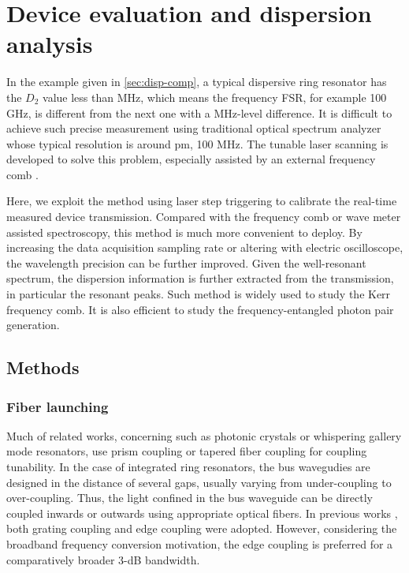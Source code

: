 
\chapter{Device evaluation and dispersion analysis}%


In the example given in \autoref{sec:disp-comp},  a typical dispersive ring resonator has the $ D_2 $ value less than MHz, which means the frequency FSR, for example 100 GHz, is different from the next one with a MHz-level difference. It is difficult to achieve such precise measurement using traditional optical spectrum analyzer whose typical resolution is around pm, 100 MHz. The tunable laser scanning is developed to solve this problem, especially assisted by an external frequency comb \cite{Liu2016d}. 

Here, we exploit the method using laser step triggering to calibrate the real-time measured device transmission. Compared with the frequency comb or wave meter assisted spectroscopy, this method is much more convenient to deploy. By increasing the data acquisition sampling rate or altering with electric oscilloscope, the wavelength precision can be further improved.
Given the well-resonant spectrum, the dispersion information is further extracted from the transmission, in particular the resonant peaks. Such method is widely used to study the Kerr frequency comb. It is also efficient to study the frequency-entangled photon pair generation.

\section{Methods}

\subsection{Fiber launching}
Much of related works, concerning such as photonic crystals or whispering gallery mode resonators, use prism coupling or tapered fiber coupling for coupling tunability. 
In the case of integrated ring resonators, the bus wavegudies are designed in the distance of several gaps, usually varying from under-coupling to over-coupling. 
Thus, the light confined in the bus waveguide can be directly coupled inwards or outwards using appropriate optical fibers. 
In previous works \cite{Sunada2018}, both grating coupling and edge coupling were adopted. However, considering the broadband frequency conversion motivation, the edge coupling is preferred for a comparatively broader 3-dB bandwidth. 
 
